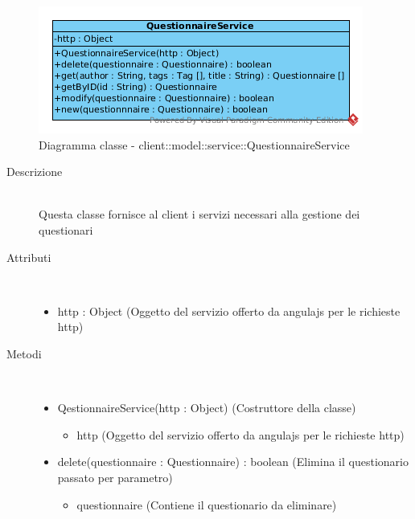\vspace{0.5cm}
\hypertarget{client::model::service::QuestionnaireService}{}
\begin{center}
			\begin{figure}[H]
				\centering \includegraphics[scale=4, max width=\textwidth, max height=\myheight]{../img/diagrammiClassi/client/model/service/QuestionnaireService.png}
				\caption{Diagramma classe - client::model::service::QuestionnaireService}
			\end{figure}
		\end{center}\begin{description}
\item[Descrizione] \hfill \\
 Questa classe fornisce al client i servizi necessari alla gestione dei questionari
\item[Attributi] \hfill \\
 \vspace{-7mm}
\begin{itemize}
\item http : Object (Oggetto del servizio offerto da angulajs per le richieste http)
\end{itemize}

\item[Metodi] \hfill \\
 \vspace{-7mm}
\begin{itemize}
\item QestionnaireService(http : Object) (Costruttore della classe)\begin{itemize}
\item http (Oggetto del servizio offerto da angulajs per le richieste http)
\end{itemize}

\item delete(questionnaire : Questionnaire) : boolean (Elimina il questionario passato per parametro)\begin{itemize}
\item questionnaire (Contiene il questionario da eliminare)
\end{itemize}


\end{itemize}
\end{description}
